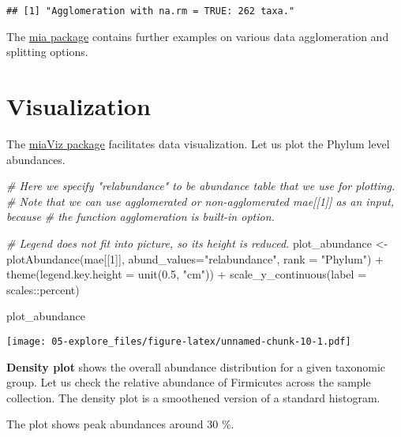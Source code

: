 \documentclass[
  oneside]{book}
\newenvironment{Shaded}{\begin{snugshade}}{\end{snugshade}}
\newcommand{\AttributeTok}[1]{\textcolor[rgb]{0.77,0.63,0.00}{#1}}
\newcommand{\CommentTok}[1]{\textcolor[rgb]{0.56,0.35,0.01}{\textit{#1}}}
\newcommand{\DecValTok}[1]{\textcolor[rgb]{0.00,0.00,0.81}{#1}}
\newcommand{\FloatTok}[1]{\textcolor[rgb]{0.00,0.00,0.81}{#1}}
\newcommand{\FunctionTok}[1]{\textcolor[rgb]{0.00,0.00,0.00}{#1}}
\newcommand{\NormalTok}[1]{#1}
\newcommand{\OtherTok}[1]{\textcolor[rgb]{0.56,0.35,0.01}{#1}}
\newcommand{\SpecialCharTok}[1]{\textcolor[rgb]{0.00,0.00,0.00}{#1}}
\newcommand{\StringTok}[1]{\textcolor[rgb]{0.31,0.60,0.02}{#1}}
\begin{document}
\begin{verbatim}
## [1] "Agglomeration with na.rm = TRUE: 262 taxa."
\end{verbatim}

The \href{https://microbiome.github.io/mia/reference/index.html}{mia
package}
contains further examples on various data agglomeration and splitting
options.

\hypertarget{visualization}{%
\section{Visualization}\label{visualization}}

The \href{https://microbiome.github.io/miaViz/}{miaViz package} facilitates
data visualization. Let us plot the Phylum level abundances.

\begin{Shaded}
\begin{Highlighting}[]
\CommentTok{\# Here we specify "relabundance" to be abundance table that we use for plotting.}
\CommentTok{\# Note that we can use agglomerated or non{-}agglomerated mae[[1]] as an input, because}
\CommentTok{\# the function agglomeration is built{-}in option. }

\CommentTok{\# Legend does not fit into picture, so its height is reduced.}
\NormalTok{plot\_abundance }\OtherTok{\textless{}{-}} \FunctionTok{plotAbundance}\NormalTok{(mae[[}\DecValTok{1}\NormalTok{]], }\AttributeTok{abund\_values=}\StringTok{"relabundance"}\NormalTok{, }\AttributeTok{rank =} \StringTok{"Phylum"}\NormalTok{) }\SpecialCharTok{+}
  \FunctionTok{theme}\NormalTok{(}\AttributeTok{legend.key.height =} \FunctionTok{unit}\NormalTok{(}\FloatTok{0.5}\NormalTok{, }\StringTok{"cm"}\NormalTok{)) }\SpecialCharTok{+}
  \FunctionTok{scale\_y\_continuous}\NormalTok{(}\AttributeTok{label =}\NormalTok{ scales}\SpecialCharTok{::}\NormalTok{percent)}

\NormalTok{plot\_abundance }
\end{Highlighting}
\end{Shaded}

\texttt{[image: 05-explore\_files/figure-latex/unnamed-chunk-10-1.pdf]}

\textbf{Density plot} shows the overall abundance distribution for a given
taxonomic group. Let us check the relative abundance of Firmicutes
across the sample collection. The density plot is a smoothened
version of a standard histogram.

The plot shows peak abundances around 30 \%.
\end{document}
